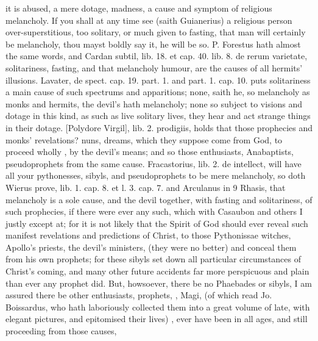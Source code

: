 {it is abused, a mere dotage, madness, a cause and symptom of religious
melancholy. If you shall at any time see (saith Guianerius) a
religious person over-superstitious, too solitary, or much given to
fasting, that man will certainly be melancholy, thou mayst boldly say
it, he will be so. P. Forestus hath almost the same words, and
Cardan subtil, lib. 18. et cap. 40. lib. 8. de rerum varietate,
solitariness, fasting, and that melancholy humour, are the causes of
all hermits' illusions. Lavater, de spect. cap. 19. part. 1. and part.
1. cap. 10. puts solitariness a main cause of such spectrums and
apparitions; none, saith he, so melancholy as monks and hermits, the
devil's hath melancholy; none so subject to visions and dotage in
this kind, as such as live solitary lives, they hear and act strange
things in their dotage. [Polydore Virgil], lib. 2. prodigiis, holds
that those prophecies and monks' revelations? nuns, dreams, which they
suppose come from God, to proceed wholly , by the
devil's means; and so those enthusiasts, Anabaptists, pseudoprophets
from the same cause. Fracastorius, lib. 2. de intellect, will
have all your pythonesses, sibyls, and pseudoprophets to be mere
melancholy, so doth Wierus prove, lib. 1. cap. 8. et l. 3. cap. 7. and
Arculanus in 9 Rhasis, that melancholy is a sole cause, and the devil
together, with fasting and solitariness, of such  prophecies,
if there were ever any such, which with Casaubon and others I justly
except at; for it is not likely that the Spirit of God should ever
reveal such manifest revelations and predictions of Christ, to those
Pythonissae witches, Apollo's priests, the devil's ministers, (they
were no better) and conceal them from his own prophets; for these
sibyls set down all particular circumstances of Christ's coming, and
many other future accidents far more perspicuous and plain than ever
any prophet did. But, howsoever, there be no Phaebades or sibyls, I am
assured there be other enthusiasts, prophets, , Magi, (of
which read Jo. Boissardus, who hath laboriously collected them into a
great volume of late, with elegant pictures, and epitomised their
lives) \etc{}, ever have been in all ages, and still proceeding from those
causes, }
